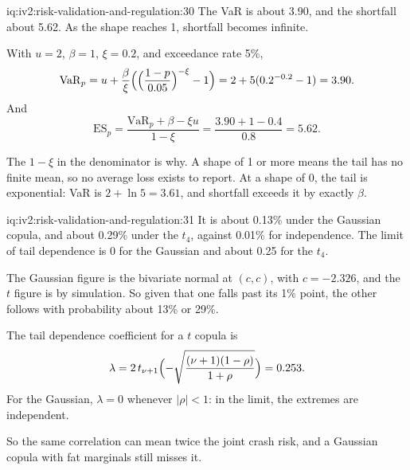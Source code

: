 \begin{solution}{iq:iv2:risk-validation-and-regulation:30}
The VaR is about 3.90, and the shortfall about 5.62. As the shape reaches 1, shortfall becomes infinite.

With $u = 2$, $\beta = 1$, $\xi = 0.2$, and exceedance rate 5\%,
\[
\mathrm{VaR}_p = u + \frac{\beta}{\xi}\Bigl(\Bigl(\frac{1 - p}{0.05}\Bigr)^{-\xi} - 1\Bigr) = 2 + 5(0.2^{-0.2} - 1) = 3.90.
\]
And
\[
\mathrm{ES}_p = \frac{\mathrm{VaR}_p + \beta - \xi u}{1 - \xi} = \frac{3.90 + 1 - 0.4}{0.8} = 5.62.
\]

The $1 - \xi$ in the denominator is why. A shape of 1 or more means the tail has no finite mean, so no average loss exists to report. At a shape of 0, the tail is exponential: VaR is $2 + \ln 5 = 3.61$, and shortfall exceeds it by exactly $\beta$.

\end{solution}

\begin{solution}{iq:iv2:risk-validation-and-regulation:31}
It is about 0.13\% under the Gaussian copula, and about 0.29\% under the $t_4$, against 0.01\% for independence. The limit of tail dependence is 0 for the Gaussian and about 0.25 for the $t_4$.

The Gaussian figure is the bivariate normal at $(c, c)$, with $c = -2.326$, and the $t$ figure is by simulation. So given that one falls past its 1\% point, the other follows with probability about 13\% or 29\%.

The tail dependence coefficient for a $t$ copula is
\[
\lambda = 2\,t_{\nu + 1}\Bigl(-\sqrt{\frac{(\nu + 1)(1 - \rho)}{1 + \rho}}\Bigr) = 0.253.
\]
For the Gaussian, $\lambda = 0$ whenever $|\rho| < 1$: in the limit, the extremes are independent.

So the same correlation can mean twice the joint crash risk, and a Gaussian copula with fat marginals still misses it.

\end{solution}

